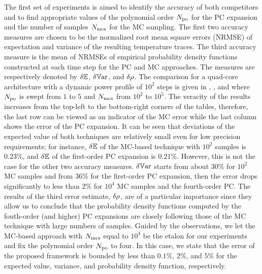 


The first set of experiments is aimed to identify the accuracy of both competitors and to find appropriate values of the polynomial order ${N_\text{po}}$ for the PC expansion and the number of samples $N_\text{mcs}$ for the MC sampling. The first two accuracy measures are chosen to be the normalized root mean square errors (NRMSE) of expectation and variance of the resulting temperature traces. The third accuracy measure is the mean of NRMSEs of empirical probability density functions constructed at each time step for the PC and MC approaches. The measures are respectively denoted by $\delta\mathbb{E}$, $\delta\mathbb{V}\text{ar}$, and $\delta\rho$. The comparison for a quad-core architecture with a dynamic power profile of $10^2$ steps is given in , , and  where ${N_\text{po}}$ is swept from $1$ to $5$ and $N_\text{mcs}$ from $10^2$ to $10^5$. The veracity of the results increases from the top-left to the bottom-right corners of the tables, therefore, the last row can be viewed as an indicator of the MC error while the last column shows the error of the PC expansion. It can be seen that deviations of the expected value of both techniques are relatively small even for low precision requirements; for instance, $\delta\mathbb{E}$ of the MC-based technique with $10^2$ samples is $0.23\%$, and $\delta\mathbb{E}$ of the first-order PC expansion is $0.21\%$. However, this is not the case for the other two accuracy measures. $\delta\mathbb{V}\text{ar}$ starts from about $30\%$ for $10^2$ MC samples and from $36\%$ for the first-order PC expansion, then the error drops significantly to less than $2\%$ for $10^4$ MC samples and the fourth-order PC. The results of the third error estimate, $\delta\rho$, are of a particular importance since they allow us to conclude that the probability density functions computed by the fouth-order (and higher) PC expansions are closely following those of the MC technique with large numbers of samples. Guided by the observations, we let the MC-based approach with $N_\text{mcs}$ equal to $10^4$ be the etalon for our experiments and fix the polynomial order ${N_\text{po}}$ to four. In this case, we state that the error of the proposed framework is bounded by less than $0.1\%$, $2\%$, and $5\%$ for the expected value, variance, and probability density function, respectively.

